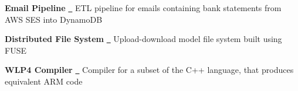\textbf{Email Pipeline} \href{https://github.com/ininicho/personal-pipeline}{\github\ }
ETL pipeline for emails containing bank statements from AWS SES into DynamoDB \par
\textbf{Distributed File System} \href{https://github.com/ininicho/watdfs}{\github\ }
Upload-download model file system built using FUSE \par
\textbf{WLP4 Compiler} \href{https://gitfront.io/r/ininicho/pjpiqr4YskSL/compiler/}{\github\ }
Compiler for a subset of the C++ language, that produces equivalent ARM code \par
